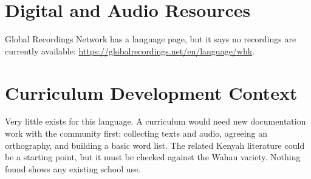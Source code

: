 \documentclass[12pt]{article}
\begin{document}
\section{Digital and Audio Resources}
Global Recordings Network has a language page, but it says no recordings are currently available: \url{https://globalrecordings.net/en/language/whk}.

\section{Curriculum Development Context}
Very little exists for this language. A curriculum would need new documentation work with the community first: collecting texts and audio, agreeing an orthography, and building a basic word list. The related Kenyah literature could be a starting point, but it must be checked against the Wahau variety. Nothing found shows any existing school use.
\end{document}
